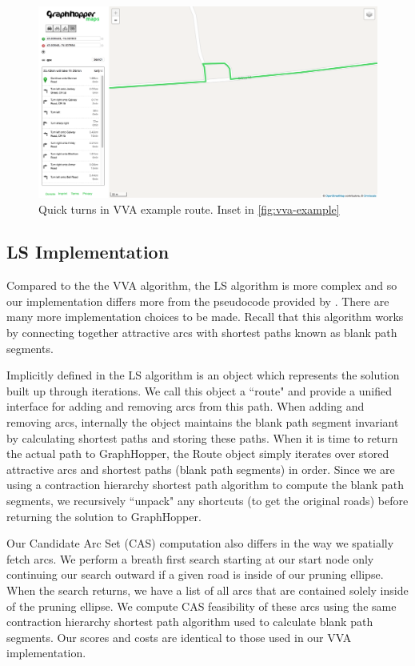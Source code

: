 \documentclass[honors]{union-cs-thesis}
\begin{document}
\begin{figure}
    \begin{center}
        \includegraphics[width=\textwidth]{figs/vva-route-turn}
    \end{center}
    \caption[VVA quick turns]{Quick turns in VVA example route. Inset in \cref{fig:vva-example}}
    \label{fig:vva-example-turn}
\end{figure}


\subsection{LS Implementation}
Compared to the the VVA algorithm, the LS algorithm is more complex and so our implementation differs more from the pseudocode provided by \citeauthor{lu2015arc}. There are many more implementation choices to be made. Recall that this algorithm works by connecting together attractive arcs with shortest paths known as blank path segments. 

Implicitly defined in the LS algorithm is an object which represents the solution built up through iterations. We call this object a ``route" and provide a unified interface for adding and removing arcs from this path. When adding and removing arcs, internally the object maintains the blank path segment invariant by calculating shortest paths and storing these paths. When it is time to return the actual path to GraphHopper, the Route object simply iterates over stored attractive arcs and shortest paths (blank path segments) in order. Since we are using a contraction hierarchy shortest path algorithm to compute the blank path segments, we recursively ``unpack" any shortcuts (to get the original roads) before returning the solution to GraphHopper. 

Our Candidate Arc Set (CAS) computation also differs in the way we spatially fetch arcs. We perform a breath first search starting at our start node only continuing our search outward if a given road is inside of our pruning ellipse. When the search returns, we have a list of all arcs that are contained solely inside of the pruning ellipse. We compute CAS feasibility of these arcs using the same contraction hierarchy shortest path algorithm used to calculate blank path segments. Our scores and costs are identical to those used in our VVA implementation.
\end{document}
